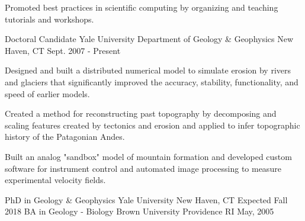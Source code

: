 \documentclass[11pt, letter]{awesome-cv}
\begin{document}
\begin{cventries}
{\begin{cvitems}
        \item {Promoted best practices in scientific computing by organizing and teaching tutorials and workshops.}
      \end{cvitems}
    }
  \cventry
    {Doctoral Candidate}
    {Yale University Department of Geology \& Geophysics}
    {New Haven, CT}
    {Sept. 2007 - Present}
    {
      \begin{cvitems}
        \item {Designed and built a distributed numerical model to simulate erosion by rivers and glaciers that significantly improved the accuracy, stability, functionality, and speed of earlier models.}
        \item {Created a method for reconstructing past topography by decomposing and scaling features created by tectonics and erosion and applied to infer topographic history of the Patagonian Andes.}
        \item{Built an analog "sandbox" model of mountain formation and developed custom software for instrument control and automated image processing to measure experimental velocity fields.}
      \end{cvitems} 
    }
\end{cventries}

\begin{cventries}
  \cventry
    {PhD in Geology \& Geophysics}
    {Yale University}
    {New Haven, CT}
    {Expected Fall 2018}
    {}
  \cventry
    {BA in Geology - Biology}
    {Brown University}
    {Providence RI}
    {May, 2005}
    {}
\end{cventries}
\end{document}
